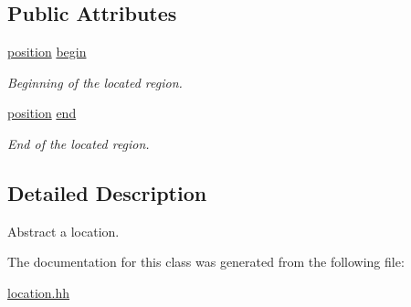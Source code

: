 \subsection*{Public Attributes}
\begin{DoxyCompactItemize}
\item 
\hypertarget{classyy_1_1location_a70540e90479a85db4112b552d7e032cf}{\hyperlink{classyy_1_1position}{position} \hyperlink{classyy_1_1location_a70540e90479a85db4112b552d7e032cf}{begin}}\label{classyy_1_1location_a70540e90479a85db4112b552d7e032cf}

\begin{DoxyCompactList}\small\item\em Beginning of the located region. \end{DoxyCompactList}\item 
\hypertarget{classyy_1_1location_aa9be2a89fdb63da08167ebd4b819addd}{\hyperlink{classyy_1_1position}{position} \hyperlink{classyy_1_1location_aa9be2a89fdb63da08167ebd4b819addd}{end}}\label{classyy_1_1location_aa9be2a89fdb63da08167ebd4b819addd}

\begin{DoxyCompactList}\small\item\em End of the located region. \end{DoxyCompactList}\end{DoxyCompactItemize}


\subsection{Detailed Description}
Abstract a location. 

The documentation for this class was generated from the following file\-:\begin{DoxyCompactItemize}
\item 
\hyperlink{location_8hh}{location.\-hh}\end{DoxyCompactItemize}
